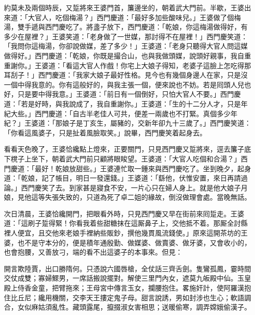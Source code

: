 約莫未及兩個時辰，又踅將來王婆門首，簾邊坐的，朝着武大門前。半歇，王婆出來道：「大官人，吃個梅湯？」西門慶道：「最好多加些酸味兒。」王婆做了個梅湯，雙手遞與西門慶吃了。將盞子放下，西門慶道：「乾娘，你這梅湯做得好，有多少在屋裡？」王婆笑道：「老身做了一世媒，那討得不在屋裡！」西門慶笑道：「我問你這梅湯，你卻說做媒，差了多少！」王婆道：「老身只聽得大官人問這媒做得好。」西門慶道：「乾娘，你既是撮合山，也與我做頭媒，說頭好親事，{}我自重重謝你。」王婆道：「看這大官人作戲！你宅上大娘子得知，老婆子這臉上怎吃得那耳刮子！」西門慶道：「我家大娘子最好性格。見今也有幾個身邊人在家，只是沒一個中得我意的。你有這般好的，與我主張一個，便來說也不妨。若是囘頭人兒也好，{}只是要中得我意。」王婆道：「前日有一個倒好，只怕大官人不要。」西門慶道：「若是好時，與我說成了，我自重謝你。」王婆道：「生的十二分人才，只是年紀大些。」西門慶道：「自古半老佳人可共，便差一兩歲也不打緊。真個多少年紀？」王婆道：「那娘子是丁亥生，屬豬的，交新年卻九十三歲了。」{}西門慶笑道：「你看這風婆子，只是扯着風臉取笑。」說畢，西門慶笑着起身去。

看看天色晚了，王婆恰纔點上燈來，正要關門，只見西門慶又踅將來，逕去簾子底下櫈子上坐下，朝着武大門前只顧將眼睃望。{}王婆道：「大官人吃個和合湯？」西門慶道：「最好！乾娘放甜些。」王婆連忙取一鍾來與西門慶吃了。坐到晚夕，起身道：「乾娘，記了帳目，明日一發還錢。」王婆道：「繇他，伏惟安置，來日再請過論。」西門慶笑了去。到家甚是寢食不安，一片心只在婦人身上。就是他大娘子月娘，{}見他這等失張失致的，只道為死了卓二姐的緣故，倒沒做理會處。當晚無話。

次日清晨，王婆恰纔開門，把眼看外時，只見西門慶又早在街前來囘踅走。王婆道：「這刷子踅得緊！你看我着些甜糖抹在這厮鼻子上，交他抵不着。那厮全討縣裡人便宜，且交他來老娘手裡納些販鈔，撰他幾貫風流錢使。」原來這開茶坊的王婆，也不是守本分的，便是積年通殷勤、做媒婆、做賣婆、做牙婆，又會收小的，也會抱腰，又善放刁，端的看不出這婆子的本事來。但見：

\begin{myquote}
開言欺陸賈，出口勝隋何。只憑說六國唇槍，全仗話三齊舌劍。隻鸞孤鳳，霎時間交仗成雙；寡婦鰥男，一席話搬說擺對。解使三里門內女，遮莫九皈殿中仙。玉皇殿上侍香金童，把臂拖來；王母宮中傳言玉女，攔腰抱住。畧施奸計，使阿羅漢抱住比丘尼；纔用機關，交李天王摟定鬼子母。甜言說誘，男如封涉也生心；軟語調合，女似麻姑須亂性。藏頭露尾，攛掇淑女害相思；送暖偷寒，調弄嫦娥偷漢子。
\end{myquote}

